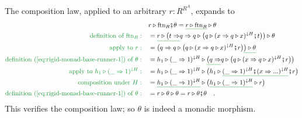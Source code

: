 The composition law, applied to an arbitrary $r:R^{R^{A}}$, expands
to
\begin{align*}
 & r\triangleright\text{ftn}_{R}\bef\theta=\gunderline{r\triangleright\text{ftn}_{R}}\triangleright\theta\\
{\color{greenunder}\text{definition of }\text{ftn}_{R}:}\quad & =\gunderline{r\triangleright\big(t\Rightarrow}q\Rightarrow q\triangleright\big(q\triangleright(x\Rightarrow q\triangleright x)^{\downarrow H}\bef t\big)\big)\triangleright\theta\\
{\color{greenunder}\text{apply to }r:}\quad & =\big(q\Rightarrow q\triangleright\big(q\triangleright(x\Rightarrow q\triangleright x)^{\downarrow H}\bef r\big)\gunderline{\big)\triangleright\theta}\\
{\color{greenunder}\text{definition~(\ref{eq:rigid-monad-base-runner-1}) of }\theta:}\quad & =h_{1}\triangleright(\_\Rightarrow1)^{\downarrow H}\triangleright\gunderline{\big(q\Rightarrow}q\triangleright\big(q\triangleright(x\Rightarrow q\triangleright x)^{\downarrow H}\bef r\big)\big)\\
{\color{greenunder}\text{apply to }h_{1}\triangleright(\_\Rightarrow1)^{\downarrow H}:}\quad & =h_{1}\triangleright(\_\Rightarrow1)^{\downarrow H}\triangleright\big(h_{1}\triangleright\gunderline{(\_\Rightarrow1)^{\downarrow H}\bef(x\Rightarrow...)^{\downarrow H}}\bef r\big)\\
{\color{greenunder}\text{composition under }H:}\quad & =\gunderline{h_{1}\triangleright(\_\Rightarrow1)^{\downarrow H}}\triangleright\big(\gunderline{h_{1}\triangleright(\_\Rightarrow1)^{\downarrow H}}\triangleright r\big)\\
{\color{greenunder}\text{definition~(\ref{eq:rigid-monad-base-runner-1}) of }\theta:}\quad & =r\triangleright\theta\triangleright\theta=r\triangleright\theta\bef\theta\quad.
\end{align*}
This verifies the composition law; so $\theta$ is indeed a monadic
morphism.

